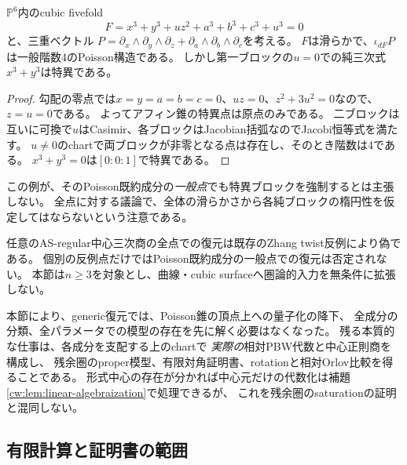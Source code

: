 \begin{example}[全体が滑らかでも純ブロックは特異になり得る]
\label{cw:ex:singular-block}
$\mathbb P^6$内のcubic fivefold
\[
 F=x^3+y^3+u z^2+a^3+b^3+c^3+u^3=0
\]
と、三重ベクトル
$P=\partial_x\wedge\partial_y\wedge\partial_z+
\partial_a\wedge\partial_b\wedge\partial_c$を考える。
$F$は滑らかで、$\iota_{dF}P$は一般階数4のPoisson構造である。
しかし第一ブロックの$u=0$での純三次式$x^3+y^3$は特異である。
\end{example}
\begin{proof}
勾配の零点では$x=y=a=b=c=0$、$uz=0$、$z^2+3u^2=0$なので、$z=u=0$である。
よってアフィン錐の特異点は原点のみである。
二ブロックは互いに可換で$u$はCasimir、各ブロックはJacobian括弧なのでJacobi恒等式を満たす。
$u\ne0$のchartで両ブロックが非零となる点は存在し、そのとき階数は4である。
$x^3+y^3=0$は$[0:0:1]$で特異である。
\end{proof}
\begin{remark}
この例が、そのPoisson既約成分の\emph{一般点}でも特異ブロックを強制するとは主張しない。
全点に対する議論で、全体の滑らかさから各純ブロックの楕円性を仮定してはならないという注意である。
\end{remark}

\begin{remark}[全非可換成分との区別]\label{rem:all-components-nc-scope}
任意のAS-regular中心三次商の全点での復元は既存のZhang twist反例により偽である。
個別の反例点だけではPoisson既約成分の一般点での復元は否定されない。
本節は$n\ge3$を対象とし、曲線・cubic surfaceへ圏論的入力を無条件に拡張しない。
\end{remark}

本節により、generic復元では、Poisson錐の頂点上への量子化の降下、
全成分の分類、全パラメータでの模型の存在を先に解く必要はなくなった。
残る本質的な仕事は、各成分を支配する上のchartで
\emph{実際の}相対PBW代数と中心正則商を構成し、
残余圏のproper模型、有限対角証明書、rotationと相対Orlov比較を得ることである。
形式中心の存在が分かれば中心元だけの代数化は補題\ref{cw:lem:linear-algebraization}で処理できるが、
これを残余圏のsaturationの証明と混同しない。

\subsection{有限計算と証明書の範囲}

